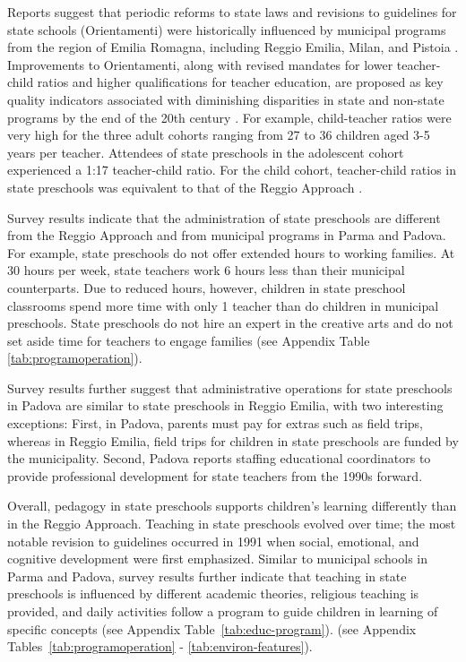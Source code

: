 Reports suggest that periodic reforms to state laws and revisions to guidelines for state schools (Orientamenti) were historically influenced by municipal programs from the region of Emilia Romagna, including Reggio Emilia, Milan, and Pistoia \citep{OECD_2001_Italy-Country-Note}. Improvements to Orientamenti, along with revised mandates for lower teacher-child ratios and higher qualifications for teacher education, are proposed as key quality indicators associated with diminishing disparities in state and non-state programs by the end of the 20th century \citep{Hohnerlein_2015_Development-and-Diffusion}. For example, child-teacher ratios were very high for the three adult cohorts ranging from 27 to 36 children aged 3-5 years per teacher. Attendees of state preschools in the adolescent cohort experienced a 1:17 teacher-child ratio. For the child cohort, teacher-child ratios in state preschools was equivalent to that of the Reggio Approach \citep{Hohnerlein_2015_Development-and-Diffusion}.

Survey results indicate that the administration of state preschools are different from the Reggio Approach and from municipal programs in Parma and Padova. For example, state preschools do not offer extended hours to working families. At 30 hours per week, state teachers work 6 hours less than their municipal counterparts. Due to reduced hours, however, children in state preschool classrooms spend more time with only 1 teacher than do children in municipal preschools. State preschools do not hire an expert in the creative arts and do not set aside time for teachers to engage families (see Appendix Table \ref{tab:programoperation}). 

Survey results further suggest that administrative operations for state preschools in Padova are similar to state preschools in Reggio Emilia, with two interesting exceptions: First, in Padova, parents must pay for extras such as field trips, whereas in Reggio Emilia, field trips for children in state preschools are funded by the municipality. Second, Padova reports staffing educational coordinators to provide professional development for state teachers from the 1990s forward. 

Overall, pedagogy in state preschools supports children's learning differently than in the Reggio Approach. Teaching in state preschools evolved over time; the most notable revision to guidelines occurred in 1991 when social, emotional, and cognitive development were first emphasized. Similar to municipal schools in Parma and Padova, survey results further indicate that teaching in state preschools is influenced by different academic theories, religious teaching is provided, and daily activities follow a program to guide children in learning of specific concepts (see Appendix Table~\ref{tab:educ-program}).  (see Appendix Tables~\ref{tab:programoperation} - \ref{tab:environ-features}). 


